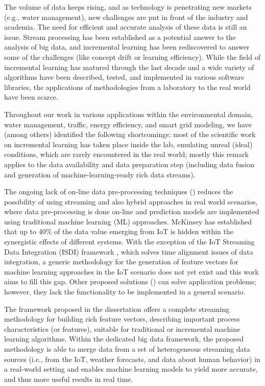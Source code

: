 The volume of data keeps rising, and as technology is penetrating new markets (e.g., water management), new challenges are put in front of the industry and academia. 
The need for efficient and accurate analysis of these data is still an issue. 
Stream processing has been established as a potential answer to the analysis of big data, and incremental learning has been rediscovered to answer some of the challenges (like concept drift or learning efficiency). 
While the field of incremental learning has matured through the last decade and a wide variety of algorithms have been described, tested, and implemented in various software libraries, the applications of methodologies from a laboratory to the real world have been scarce.

Throughout our work in various applications within the environmental domain, water management, traffic, energy efficiency, and smart grid modeling, we have (among others) identified the following shortcomings: most of the scientific work on incremental learning has taken place inside the lab, emulating unreal (ideal) conditions, which are rarely encountered in the real world; mostly this remark applies to the data availability and data preparation step (including data fusion and generation of machine-learning-ready rich data streams).

The ongoing lack of on-line data pre-processing techniques (\cite{kolajo:2019:big, bahri:2021:data}) reduces the possibility of using streaming and also hybrid approaches in real world scenarios, where data pre-processing is done on-line and prediction models are implemented using traditional machine learning (ML) approaches. 
McKinsey \cite{manyika:2015:unlocking} has established that up to $40\%$ of the data value emerging from IoT is hidden within the synergistic effects of different systems. 
With the exception of the IoT Streaming Data Integration (ISDI) framework \cite{tu:2020:isdi}, which solves time alignment issues of data integration, a generic methodology for the generation of feature vectors for machine learning approaches in the IoT scenario does not yet exist and this work aims to fill this gap.
Other proposed solutions (\cite{zhang:2019:advanced, wu:2018:sensor, zhou:2018:multimodal, wu:2019:fusion, akbar:2018:real}) can solve application problems; however, they lack the functionality to be implemented in a general scenario.

The framework proposed in the dissertation offers a complete streaming methodology for building rich feature vectors, describing important process characteristics (or features), suitable for traditional or incremental machine learning algorithms. 
Within the dedicated big data framework, the proposed methodology is able to merge data from a set of heterogeneous streaming data sources (i.e., from the IoT, weather forecasts, and data about human behavior) in a real-world setting and enables machine learning models to yield more accurate, and thus more useful results in real time.


